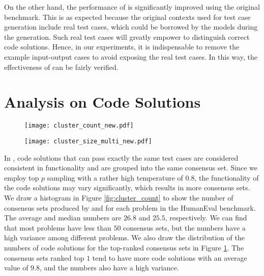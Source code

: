 On the other hand, the performance of \ours is significantly improved using the original benchmark. This is as expected because the original contexts used for test case generation include real test cases, which could be borrowed by the models during the generation. Such real test cases will greatly empower \ours to distinguish correct code solutions. Hence, in our experiments, it is indispensable to remove the example input-output cases to avoid exposing the real test cases. In this way, the effectiveness of \ours can be fairly verified.

\section{Analysis on Code Solutions}
\label{appendix_sqrt}

\begin{figure}[t]
\centering
\begin{minipage}{.49\textwidth}
  \centering
  \texttt{[image: cluster\_count\_new.pdf]}
  \label{fig:cluster_count}
\end{minipage}
\hspace{0.1cm}
\begin{minipage}{.49\textwidth}
  \centering
  \texttt{[image: cluster\_size\_multi\_new.pdf]}
  \label{fig:cluster_size}
\end{minipage}
\end{figure}

In \ours, code solutions that can pass exactly the same test cases are considered consistent in functionality and are grouped into the same consensus set. Since we employ top $p$ sampling with a rather high temperature of $0.8$, the functionality of the code solutions may vary significantly, which results in more consensus sets.  We draw a histogram in Figure \ref{fig:cluster_count} to show the number of consensus sets produced by \cushman and \ours for each problem in the HumanEval benchmark. The average and median numbers are ${26.8}$ and ${25.5}$, respectively. We can find that most problems have less than $50$ consensus sets, but the numbers have a high variance among different problems. We also draw the distribution of the numbers of code solutions for the top-ranked consensus sets in Figure \ref{fig:cluster_size}. The consensus sets ranked top $1$ tend to have more code solutions with an average value of ${9.8}$, and the numbers also have a high variance.

